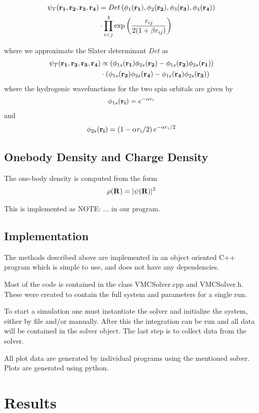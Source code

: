 \documentclass[twocolumn]{article}[10pt]
\newcommand{\eq}[1]{\begin{align*}#1\end{align*}}
\renewcommand\vec[1]{{\bf #1}}
\begin{document}
{\small
\eq{
	\psi_{T}({\bf r_1},{\bf r_2}, {\bf r_3}, {\bf r_4}) &= 
 	Det\left(\phi_{1}({\bf r_1}),\phi_{2}({\bf r_2}),
	\phi_{3}({\bf r_3}),\phi_{4}({\bf r_4})\right)\\ &\cdot
   	\prod_{i<j}^{4}\exp{\left(\frac{r_{ij}}{2(1+\beta r_{ij})}\right)}
}}%

where we approximate the Slater determinant \textit{Det} as
{\small
\eq{
	\psi_{T}({\bf r_1},{\bf r_2}, {\bf r_3}, {\bf r_4})&\propto 
	\left(\phi_{1s}({\bf r_1})\phi_{2s}({\bf r_2})-\phi_{1s}({\bf r_2})
	\phi_{2s}({\bf r_1})\right)\\
	&\cdot\left(\phi_{1s}({\bf r_3})\phi_{2s}({\bf r_4})
	-\phi_{1s}({\bf r_4})\phi_{2s}({\bf r_3})\right)
}}%
where the hydrogenic wavefunctions for the two spin orbitals
are given by
{\small\eq{
\phi_{1s}({\bf r_i}) = e^{-\alpha r_i}
}} and
{\small\eq{
\phi_{2s}({\bf r_i}) = \left(1-\alpha r_i/2\right)e^{-\alpha r_i/2}
}}

\subsection{Onebody Density and Charge Density}
The one-body density is computed from the form 
{\small
\eq{
	\rho(\vec R) = |\psi(\vec R)|^2
}}%

This is implemented as NOTE: ... in our program. 

\subsection{Implementation}
The methods described above are implemented in an object oriented C++ program
which is simple to use, and does not have any dependencies. 

Most of the code is contained in the class VMCSolver.cpp and VMCSolver.h. 
These were created to contain the full system and parameters for a single run. 

To start a simulation one must instantiate the solver and 
initialize the system, either by file and/or manually. After this
the integration can be run and all data will be contained in the solver object.
The last step is to collect data from the solver. 

All plot data are generated by individual programs using the mentioned solver. 
Plots are generated using python. 

\section{Results}
\end{document}
